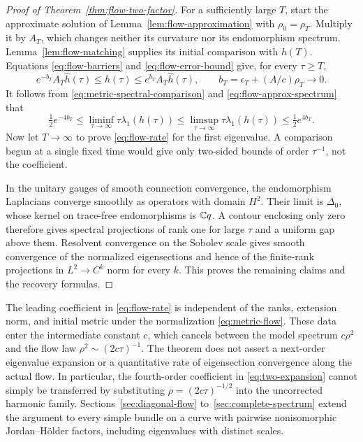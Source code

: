 \begin{proof}[Proof of Theorem~\ref{thm:flow-two-factor}]
For a sufficiently large $T$, start the approximate solution of
Lemma~\ref{lem:flow-approximation} with $\rho_0=\rho_T$.
Multiply it by $A_T$, which changes neither its curvature nor its
endomorphism spectrum. Lemma~\ref{lem:flow-matching} supplies its
initial comparison with $h(T)$. Equations
\eqref{eq:flow-barriers} and \eqref{eq:flow-error-bound} give,
for every $\tau\ge T$,
\[
 e^{-b_T}A_T\widehat h(\tau)
 \le h(\tau)\le e^{b_T}A_T\widehat h(\tau),\qquad
 b_T=\epsilon_T+(A/c)\rho_T\longrightarrow0.
\]
It follows from \eqref{eq:metric-spectral-comparison} and
\eqref{eq:flow-approx-spectrum} that
\[
 \tfrac12e^{-4b_T}
 \le\liminf_{\tau\to\infty}\tau\lambda_1(h(\tau))
 \le\limsup_{\tau\to\infty}\tau\lambda_1(h(\tau))
 \le\tfrac12e^{4b_T}.
\]
Now let $T\to\infty$ to prove \eqref{eq:flow-rate} for the first
eigenvalue. A comparison begun at a single fixed time would give
only two-sided bounds of order $\tau^{-1}$, not the coefficient.

In the unitary gauges of smooth connection convergence, the
endomorphism Laplacians converge smoothly as operators with domain
$H^2$. Their limit is $\Delta_0$, whose kernel on trace-free
endomorphisms is $\mathbb C q$. A contour enclosing only zero therefore
gives spectral projections of rank one for large $\tau$ and a
uniform gap above them. Resolvent convergence on the Sobolev scale
gives smooth convergence of the normalized eigensections and hence
of the finite-rank projections in $L^2\to C^k$ norm for every $k$.
This proves the remaining claims and the recovery formulas.
\end{proof}

The leading coefficient in \eqref{eq:flow-rate} is independent of
the ranks, extension norm, and initial metric under the normalization
\eqref{eq:metric-flow}. These data enter the intermediate constant
$c$, which cancels between the model spectrum $c\rho^2$ and the
flow law $\rho^2\sim(2c\tau)^{-1}$. The theorem does not assert
a next-order eigenvalue expansion or a quantitative rate of
eigensection convergence along the actual flow. In particular, the
fourth-order coefficient in \eqref{eq:two-expansion} cannot simply
be transferred by substituting $\rho=(2c\tau)^{-1/2}$ into the
uncorrected harmonic family. Sections~\ref{sec:diagonal-flow}
to~\ref{sec:complete-spectrum} extend the argument to every simple bundle on
a curve with pairwise nonisomorphic Jordan--H\"older factors, including
eigenvalues with distinct scales.
